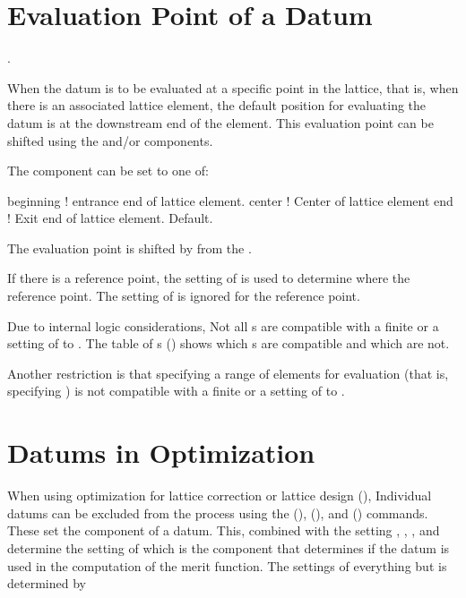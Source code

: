 \section{Evaluation Point of a Datum}.
\label{s:dat.eval}

When the datum is to be evaluated at a specific point in the lattice, that is, when there
is an associated lattice element, the default position for evaluating the datum is at the
downstream end of the element. This evaluation point can be shifted using the
 and/or  components. 

The  component can be set to one of:
\begin{example}
  beginning   ! entrance end of lattice element.
  center      ! Center of lattice element
  end         ! Exit end of lattice element. Default.
\end{example}
The evaluation point is shifted by  from the .

If there is a reference point, the setting of  is used to determine where
the reference point. The setting of  is ignored for the reference point.

Due to internal logic considerations, Not all s are compatible with a finite
 or a setting of  to . The table of s
() shows which s are compatible and which are not.

Another restriction is that specifying a range of elements for evaluation (that is,
specifying  ) is not compatible with a finite
 or a setting of  to .

\section{Datums in Optimization}
\label{s:datum.opt}

When using optimization for lattice correction or lattice design (), Individual datums
can be excluded from the process using the  (), 
(), and  () commands. These set the  component of
a datum. This, combined with the setting , , , and
 determine the setting of  which is the component that determines if the
datum is used in the computation of the merit function. The settings of everything but
 is determined by \tao

